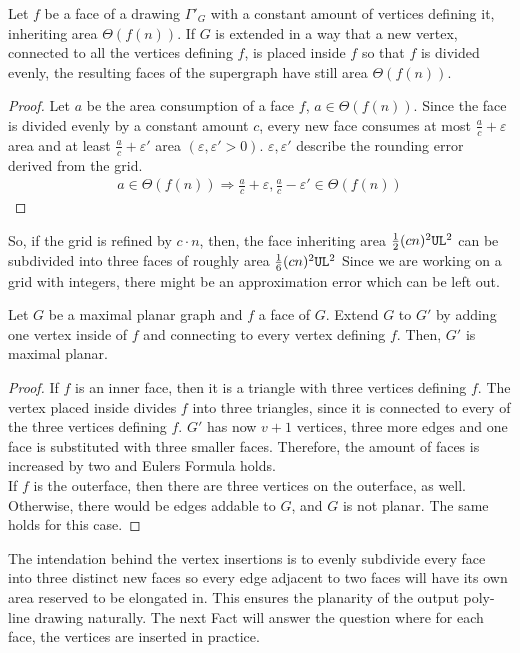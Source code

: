 \begin{fact}\label{fact:even-subdivision}
\end{fact}
Let $f$ be a face of a drawing $\Gamma'_G$ with a constant amount of vertices defining it, inheriting area $\Theta(f(n))$. If $G$ is extended in a way that a new vertex, connected to all the vertices defining $f$, is placed inside $f$ so that $f$ is divided evenly, the resulting faces of the supergraph have still area $\Theta(f(n))$.
\begin{proof}
	Let $a$ be the area consumption of a face $f$, $a \in \Theta(f(n))$. Since the face is divided evenly by a constant amount $c$, every new face consumes at most $\frac{a}{c}+\varepsilon$ area and at least $\frac{a}{c}+\varepsilon'$ area $(\varepsilon,\varepsilon'>0)$. $\varepsilon, \varepsilon'$ describe the rounding error derived from the grid.
	\begin{align*}
		a \in \Theta(f(n)) \Rightarrow \frac{a}{c}+\varepsilon, \frac{a}{c}-\varepsilon' \in \Theta(f(n))
	\end{align*}
\end{proof}

\bigskip
So, if the grid is refined by $c\cdot n$, then, the face inheriting area $\frac{1}{2}(cn)^2\texttt{UL}^2$ can be subdivided into three faces of roughly area $\frac{1}{6}(cn)^2\texttt{UL}^2$ Since we are working on a grid with integers, there might be an approximation error which can be left out.

\begin{fact}\label{fact:maximal-planar-supergraph}
\end{fact}
Let $G$ be a maximal planar graph and $f$ a face of $G$. Extend $G$ to $G'$ by adding one vertex inside of $f$ and connecting to every vertex defining $f$. Then, $G'$ is maximal planar.
\begin{proof}
	If $f$ is an inner face, then it is a triangle with three vertices defining $f$. The vertex placed inside divides $f$ into three triangles, since it is connected to every of the three vertices defining $f$. $G'$ has now $v+1$ vertices, three more edges and one face is substituted with three smaller faces. Therefore, the amount of faces is increased by two and Eulers Formula holds.\\
	If $f$ is the outerface, then there are three vertices on the outerface, as well. Otherwise, there would be edges addable to $G$, and $G$ is not planar. The same holds for this case. 
\end{proof}

\bigskip
The intendation behind the vertex insertions is to evenly subdivide every face into three distinct new faces so every edge adjacent to two faces will have its own area reserved to be elongated in. This ensures the planarity of the output poly-line drawing naturally. The next Fact will answer the question where for each face, the vertices are inserted in practice.	

